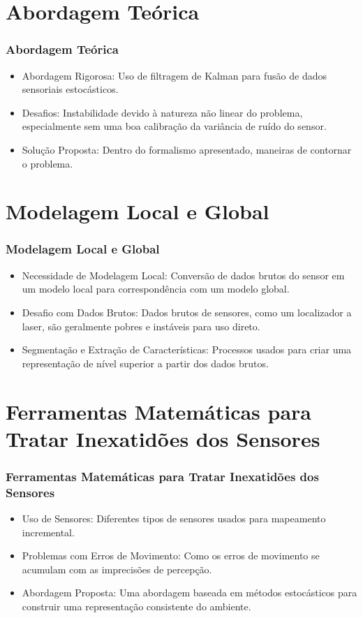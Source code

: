 \documentclass[xcolor=dvipsnames, aspectratio=169]{beamer}
\begin{document}
\section{Abordagem Teórica}
\begin{frame}
  \frametitle{Abordagem Teórica}
  \begin{itemize}
      \item Abordagem Rigorosa: Uso de filtragem de Kalman para fusão de dados sensoriais estocásticos.
      \item Desafios: Instabilidade devido à natureza não linear do problema, especialmente sem uma boa calibração da variância de ruído do sensor.
      \item Solução Proposta: Dentro do formalismo apresentado, maneiras de contornar o problema.
  \end{itemize}
\end{frame}
  
\section{Modelagem Local e Global}
\begin{frame}
  \frametitle{Modelagem Local e Global}
  \begin{itemize}
      \item Necessidade de Modelagem Local: Conversão de dados brutos do sensor em um modelo local para correspondência com um modelo global.
      \item Desafio com Dados Brutos: Dados brutos de sensores, como um localizador a laser, são geralmente pobres e instáveis para uso direto.
      \item Segmentação e Extração de Características: Processos usados para criar uma representação de nível superior a partir dos dados brutos.
  \end{itemize}
\end{frame}
  

\section{Ferramentas Matemáticas para Tratar Inexatidões dos Sensores}
  \begin{frame}
  \frametitle{Ferramentas Matemáticas para Tratar Inexatidões dos Sensores}
  \begin{itemize}
      \item Uso de Sensores: Diferentes tipos de sensores usados para mapeamento incremental.
      \item Problemas com Erros de Movimento: Como os erros de movimento se acumulam com as imprecisões de percepção.
      \item Abordagem Proposta: Uma abordagem baseada em métodos estocásticos para construir uma representação consistente do ambiente.
  \end{itemize}
  \end{frame}
  
\end{document}
